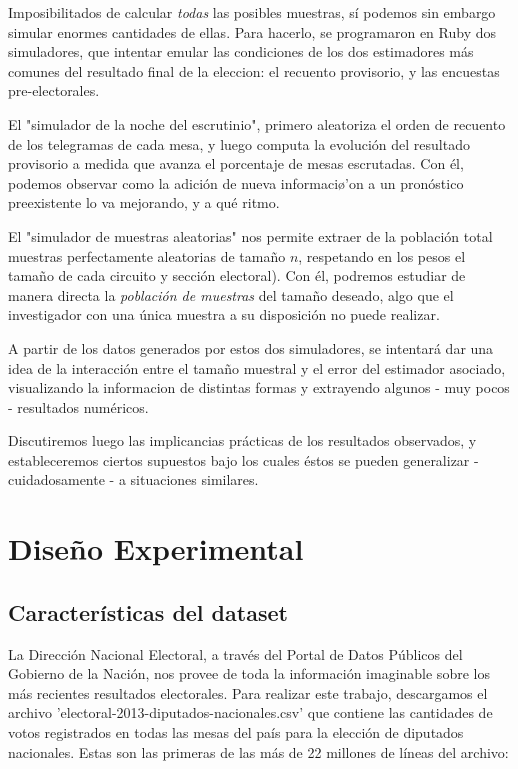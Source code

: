 \documentclass[12pt, a4paper]{article}
\begin{document}
Imposibilitados de calcular \emph{todas} las posibles muestras, s\'i podemos sin embargo simular enormes cantidades de ellas. Para hacerlo, se programaron en Ruby dos simuladores, que intentar emular las condiciones de los  dos estimadores m\'as comunes del resultado final de la eleccion: el recuento provisorio, y las encuestas pre-electorales.

El "simulador de la noche del escrutinio", primero aleatoriza el orden de recuento de los telegramas de cada mesa, y luego computa la evoluci\'on del resultado provisorio a medida que avanza el porcentaje de mesas escrutadas. Con \'el, podemos observar como la adici\'on de nueva informaci\o'on a un pron\'ostico preexistente lo va mejorando, y a qu\'e ritmo.

El "simulador de muestras aleatorias" nos permite extraer de la poblaci\'on total muestras perfectamente aleatorias de tama\~no $n$, respetando en los pesos el tama\~no de cada circuito y secci\'on electoral). Con \'el, podremos estudiar de manera directa la \emph{poblaci\'on de muestras} del tama\~no deseado, algo que el investigador con una \'unica muestra a su disposici\'on no puede realizar.

A partir de los datos generados por estos dos simuladores, se intentar\'a dar una idea de la interacci\'on entre el tama\~no muestral y el error del estimador asociado, visualizando la informacion de distintas formas y extrayendo algunos - muy pocos - resultados num\'ericos.

Discutiremos luego las implicancias pr\'acticas de los resultados observados, y estableceremos ciertos supuestos bajo los cuales \'estos se pueden generalizar -cuidadosamente - a situaciones similares.


\pagebreak

\section{Dise\~no Experimental}

\subsection{Caracter\'isticas del dataset}

La Direcci\'on Nacional Electoral, a trav\'es del Portal de Datos P\'ublicos del Gobierno de la Naci\'on, nos provee de toda la informaci\'on imaginable sobre los m\'as recientes resultados electorales. Para realizar este trabajo, descargamos el archivo 'electoral-2013-diputados-nacionales.csv' que contiene las cantidades de votos registrados en todas las mesas del pa\'is para la elecci\'on de diputados nacionales. Estas son las primeras de las m\'as de 22 millones de l\'ineas del archivo:
\end{document}
